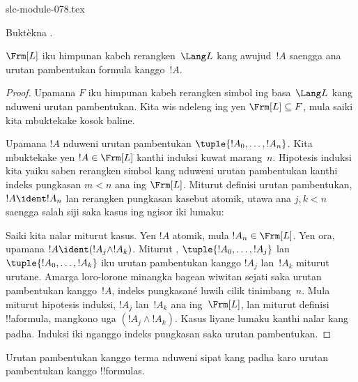 \begin{filecontents*}[overwrite]{slc-module-078.tex}
\begin{prob}
Buktèkna .
\end{prob}

\begin{thm}
$\Frm[L]$ iku himpunan kabeh rerangken~$\Lang L$ kang awujud~$!A$
saengga ana urutan pambentukan formula kanggo~$!A$.
\end{thm}

\begin{proof}
Upamana $F$ iku himpunan kabeh rerangken simbol ing basa~$\Lang L$
kang nduweni urutan pambentukan. Kita wis ndeleng ing
 yen $\Frm[L] \subseteq F$,
mula saiki kita mbuktekake kosok baline.

Upamana $!A$ nduweni urutan pambentukan
$\tuple{!A_0,\dotsc,!A_n}$. Kita mbuktekake yen
$!A \in \Frm[L]$ kanthi induksi kuwat marang~$n$.
Hipotesis induksi kita yaiku saben rerangken simbol kang nduweni
urutan pambentukan kanthi indeks pungkasan $m < n$ ana ing
$\Frm[L]$. Miturut definisi urutan pambentukan,
$!A \ident !A_n$ lan rerangken pungkasan kasebut atomik,
utawa ana $j,k < n$
saengga salah siji saka kasus ing ngisor iki lumaku:
\begin{enumerate}
\end{enumerate}
Saiki kita nalar miturut kasus. Yen $!A$ atomik, mula
$!A_n \in \Frm[L]$. Yen ora, upamana
$!A \ident (!A_j \land !A_k)$. Miturut
,
$\tuple{!A_0,\dotsc,!A_j}$ lan $\tuple{!A_0,\dotsc,!A_k}$
iku urutan pambentukan kanggo $!A_j$ lan~$!A_k$ miturut urutane.
Amarga loro-lorone minangka bagean wiwitan sejati saka urutan
pambentukan kanggo~$!A$, indeks pungkasané luwih cilik tinimbang~$n$.
Mula miturut hipotesis induksi, $!A_j$ lan~$!A_k$ ana ing~$\Frm[L]$,
lan miturut definisi !!a{formula}, mangkono uga
$(!A_j \land !A_k)$. Kasus liyane lumaku kanthi nalar kang padha.
Induksi iki nganggo indeks pungkasan saka urutan pambentukan.
\end{proof}

Urutan pambentukan kanggo terma nduweni sipat kang padha karo urutan
pambentukan kanggo !!{formula}s.


\end{filecontents*}
